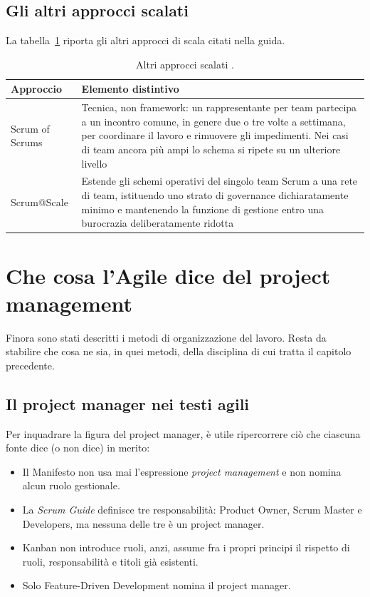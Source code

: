 \subsection{Gli altri approcci scalati}

La tabella~\ref{tab:altri-scalati} riporta gli altri approcci di scala
citati nella guida.

\begin{table}[htbp]
\centering
\small
\caption{Altri approcci scalati \cite{agilepracticeguide2}.}
\label{tab:altri-scalati}
\begin{tabularx}{\textwidth}{@{}>{\raggedright\arraybackslash}p{3.4cm}X@{}}
\toprule
\textbf{Approccio} & \textbf{Elemento distintivo} \\
\midrule
Scrum of Scrums &
Tecnica, non framework: un rappresentante per team partecipa a un incontro
comune, in genere due o tre volte a settimana, per coordinare il lavoro e
rimuovere gli impedimenti. Nei casi di team ancora pi\`u ampi lo schema si
ripete su un ulteriore livello \\
\addlinespace
Scrum@Scale &
Estende gli schemi operativi del singolo team Scrum a una rete di team,
istituendo uno strato di governance dichiaratamente minimo e mantenendo la
funzione di gestione entro una burocrazia deliberatamente ridotta \\
\bottomrule
\end{tabularx}
\end{table}


\section{Che cosa l'Agile dice del project management}
\label{sec:pm-agile}

Finora sono stati descritti i metodi di organizzazione del lavoro.
Resta da stabilire che cosa ne sia, in quei metodi, della disciplina di cui
tratta il capitolo precedente.

\subsection{Il project manager nei testi agili}

Per inquadrare la figura del project manager, \`e utile ripercorrere ci\`o che 
ciascuna fonte dice (o non dice) in merito: 
\begin {itemize}
\item Il Manifesto non usa mai l'espressione \emph{project
management} e non nomina alcun ruolo gestionale. 
\item La \emph{Scrum Guide} definisce tre responsabilit\`a: Product Owner,
Scrum Master e Developers, ma nessuna delle tre \`e un project manager.
\item Kanban non introduce ruoli, anzi, assume fra i propri principi il rispetto di
ruoli, responsabilit\`a e titoli gi\`a esistenti.
\item Solo Feature-Driven Development nomina il project manager.
\end {itemize}

